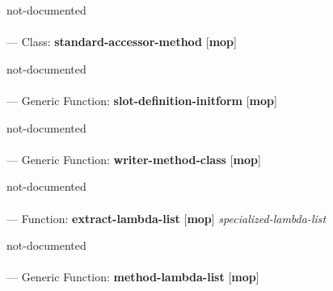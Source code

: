 \begin{adjustwidth}{5em}{5em}
not-documented
\end{adjustwidth}

\paragraph{}
\label{MOP:STANDARD-ACCESSOR-METHOD}
--- Class: \textbf{standard-accessor-method} [\textbf{mop}] \textit{}

\begin{adjustwidth}{5em}{5em}
not-documented
\end{adjustwidth}

\paragraph{}
\label{MOP:SLOT-DEFINITION-INITFORM}
--- Generic Function: \textbf{slot-definition-initform} [\textbf{mop}] \textit{}

\begin{adjustwidth}{5em}{5em}
not-documented
\end{adjustwidth}

\paragraph{}
\label{MOP:WRITER-METHOD-CLASS}
--- Generic Function: \textbf{writer-method-class} [\textbf{mop}] \textit{}

\begin{adjustwidth}{5em}{5em}
not-documented
\end{adjustwidth}

\paragraph{}
\label{MOP:EXTRACT-LAMBDA-LIST}
--- Function: \textbf{extract-lambda-list} [\textbf{mop}] \textit{specialized-lambda-list}

\begin{adjustwidth}{5em}{5em}
not-documented
\end{adjustwidth}

\paragraph{}
\label{MOP:METHOD-LAMBDA-LIST}
--- Generic Function: \textbf{method-lambda-list} [\textbf{mop}] \textit{}

